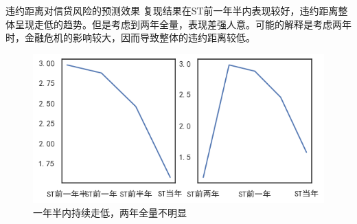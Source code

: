 \documentclass{ctexbeamer}
\begin{document}
\begin{frame}{违约距离对信贷风险的预测效果}
    复现结果在ST前一年半内表现较好，违约距离整体呈现走低的趋势。但是考虑到两年全量，表现差强人意。可能的解释是考虑两年时，金融危机的影响较大，因而导致整体的违约距离较低。
    \begin{figure}
        \includegraphics[width=0.8\linewidth]{img/st.png}
        \caption{一年半内持续走低，两年全量不明显}
    \end{figure}
\end{frame}
\end{document}
